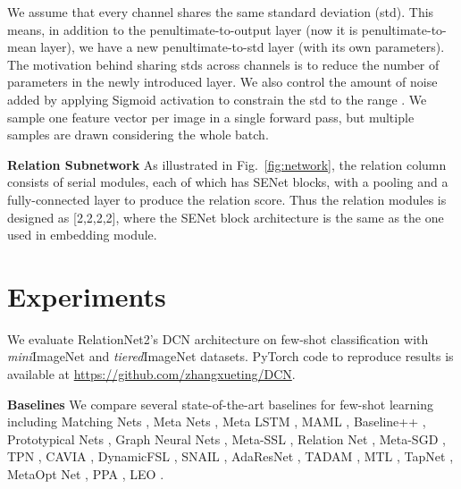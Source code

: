 \documentclass[conference]{IEEEtran}
\def\modelnameshort{DCN}
\def\tierIN{\textit{tiered}ImageNet}
\def\miniIN{\textit{mini}ImageNet}
\newcommand{\keypoint}[1]{\vspace{0.05cm}\noindent\textbf{#1}\quad}
\begin{document}
We assume that every channel shares the same standard deviation (std). This means, in addition to the penultimate-to-output layer (now it is penultimate-to-mean layer), we have a new penultimate-to-std layer (with its own parameters). The motivation behind sharing stds across channels is to reduce the number of parameters in the newly introduced layer. We also control the amount of noise added by applying Sigmoid activation to constrain the std to the range . We sample one feature vector per image in a single forward pass, but multiple samples are drawn considering the whole batch.

\keypoint{Relation Subnetwork} As illustrated in Fig.~\ref{fig:network}, the relation column consists of  serial modules, each of which has  SENet blocks, with a pooling and a fully-connected layer to produce the relation score. Thus the relation modules is designed as [2,2,2,2], where the SENet block architecture is the same as the one used in embedding module. 





















\section{Experiments}
We evaluate RelationNet2's \modelnameshort{} architecture on few-shot classification with \miniIN{} and \tierIN{} datasets. PyTorch code to reproduce results is available at \url{https://github.com/zhangxueting/DCN}. 

\keypoint{Baselines} 
We compare several state-of-the-art baselines for few-shot learning including
Matching Nets \cite{vinyals2016matching},
Meta Nets \cite{munkhdalai2017meta},
Meta LSTM \cite{ravi2017optimization}, 
MAML \cite{finn2017model},
Baseline++ \cite{chen2019closerfewshot},
Prototypical Nets \cite{snell2017prototypical}, 
Graph Neural Nets \cite{garcia2017few}, 
Meta-SSL \cite{ren2018meta}, 
Relation Net \cite{yang2018learning}, 
Meta-SGD \cite{li2017meta}, 
TPN \cite{liu2018transductive},
CAVIA \cite{zintgraf2018cavia},
DynamicFSL \cite{gidaris2018dynamic},
SNAIL \cite{mishra2018simple},
AdaResNet \cite{munkhdalai2018rapid},
TADAM \cite{oreshkin2018tadam},
MTL \cite{sun2019meta},
TapNet \cite{yoon2019tapnet}, 
MetaOpt Net \cite{lee2019meta}, 
PPA \cite{qiao2017few}, 
LEO \cite{rusu2019leo}.
\end{document}
